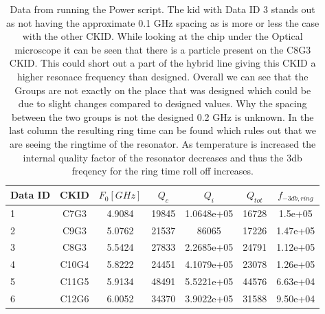\begin{table}[ht]
    \centering
    \begin{tabular}[t]{lcccccc}
    \toprule
    Data ID & CKID & $F_{0} [GHz]$ & $Q_{c}$& $Q_{i}$& $Q_{tot}$ & $f_{-3db,ring}$\\
    \midrule
    1 & C7G3 & 4.9084 & 19845 & 1.0648e+05 & 16728 & 1.5e+05 \\ \hline
	2 & C9G3 & 5.0762 & 21537 & 86065 & 17226& 1.47e+05 \\ \hline
	3 & C8G3 & 5.5424 & 27833 & 2.2685e+05 & 24791& 1.12e+05 \\ \hline
	4 & C10G4 & 5.8222 & 24451 & 4.1079e+05 & 23078& 1.26e+05 \\ \hline
	5 & C11G5 & 5.9134 & 48491 & 5.5221e+05 & 44576& 6.63e+04 \\ \hline
	6 & C12G6 & 6.0052 & 34370 & 3.9022e+05 & 31588& 9.50e+04 \\ \hline
    \bottomrule
    \end{tabular}
    \caption{Data from running the Power script. The kid with Data ID 3 stands out as not having the approximate 0.1 GHz spacing as is more or less the case with the other CKID. While looking at the chip under the Optical microscope it can be seen that there is a particle present on the C8G3 CKID. This could short out a part of the hybrid line giving this CKID a higher resonace frequency than designed. Overall we can see that the Groups are not exactly on the place that was designed which could be due to slight changes compared to designed values. Why the spacing between the two groups is not the designed 0.2 GHz is unknown. In the last column the resulting ring time can be found which rules out that we are seeing the ringtime of the resonator. As temperature is increased the internal quality factor of the resonator decreases and thus the 3db freqency for the ring time roll off increases. }
    \label{tab:}
\end{table}%


